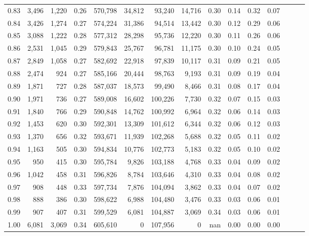 \begin{tabular}{rrrrrrrrrrrrrrr}
0.83 &   3,496 &  1,220 &  0.26 &  570,798 &   34,812 &   93,240 &   14,716 &  0.30 &  0.14 &  0.32 &      0.07 \\
0.84 &   3,426 &  1,274 &  0.27 &  574,224 &   31,386 &   94,514 &   13,442 &  0.30 &  0.12 &  0.29 &      0.06 \\
0.85 &   3,088 &  1,222 &  0.28 &  577,312 &   28,298 &   95,736 &   12,220 &  0.30 &  0.11 &  0.26 &      0.06 \\
0.86 &   2,531 &  1,045 &  0.29 &  579,843 &   25,767 &   96,781 &   11,175 &  0.30 &  0.10 &  0.24 &      0.05 \\
0.87 &   2,849 &  1,058 &  0.27 &  582,692 &   22,918 &   97,839 &   10,117 &  0.31 &  0.09 &  0.21 &      0.05 \\
0.88 &   2,474 &    924 &  0.27 &  585,166 &   20,444 &   98,763 &    9,193 &  0.31 &  0.09 &  0.19 &      0.04 \\
0.89 &   1,871 &    727 &  0.28 &  587,037 &   18,573 &   99,490 &    8,466 &  0.31 &  0.08 &  0.17 &      0.04 \\
0.90 &   1,971 &    736 &  0.27 &  589,008 &   16,602 &  100,226 &    7,730 &  0.32 &  0.07 &  0.15 &      0.03 \\
0.91 &   1,840 &    766 &  0.29 &  590,848 &   14,762 &  100,992 &    6,964 &  0.32 &  0.06 &  0.14 &      0.03 \\
0.92 &   1,453 &    620 &  0.30 &  592,301 &   13,309 &  101,612 &    6,344 &  0.32 &  0.06 &  0.12 &      0.03 \\
0.93 &   1,370 &    656 &  0.32 &  593,671 &   11,939 &  102,268 &    5,688 &  0.32 &  0.05 &  0.11 &      0.02 \\
0.94 &   1,163 &    505 &  0.30 &  594,834 &   10,776 &  102,773 &    5,183 &  0.32 &  0.05 &  0.10 &      0.02 \\
0.95 &     950 &    415 &  0.30 &  595,784 &    9,826 &  103,188 &    4,768 &  0.33 &  0.04 &  0.09 &      0.02 \\
0.96 &   1,042 &    458 &  0.31 &  596,826 &    8,784 &  103,646 &    4,310 &  0.33 &  0.04 &  0.08 &      0.02 \\
0.97 &     908 &    448 &  0.33 &  597,734 &    7,876 &  104,094 &    3,862 &  0.33 &  0.04 &  0.07 &      0.02 \\
0.98 &     888 &    386 &  0.30 &  598,622 &    6,988 &  104,480 &    3,476 &  0.33 &  0.03 &  0.06 &      0.01 \\
0.99 &     907 &    407 &  0.31 &  599,529 &    6,081 &  104,887 &    3,069 &  0.34 &  0.03 &  0.06 &      0.01 \\
1.00 &   6,081 &  3,069 &  0.34 &  605,610 &        0 &  107,956 &        0 &   nan &  0.00 &  0.00 &      0.00 \\
\bottomrule
\end{tabular}
